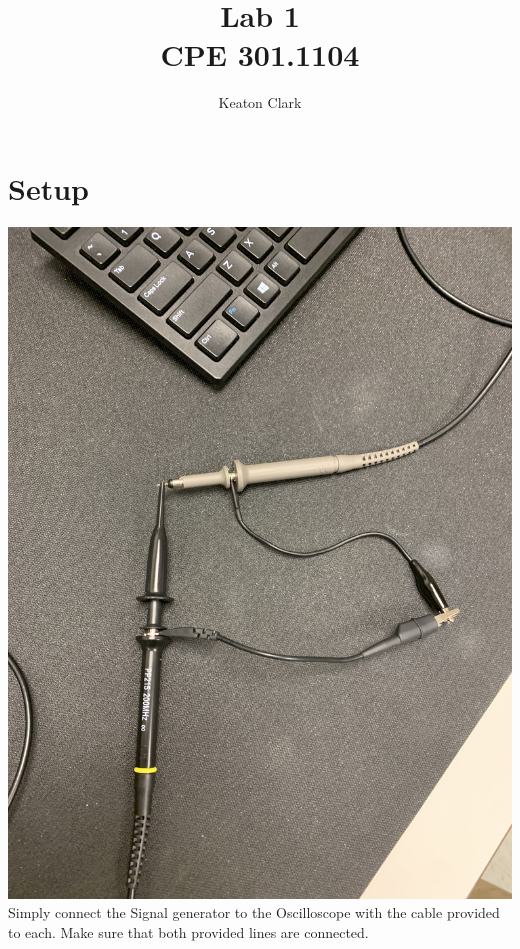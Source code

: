 \documentclass[]{article}
\title{Lab 1\\CPE 301.1104}
\author{Keaton Clark}
\begin{document}
\maketitle

\section{Setup}
\includegraphics[scale=.1]{connection.jpg}\\
Simply connect the Signal generator to the Oscilloscope with the cable provided to each. Make sure that both provided lines are connected.
\end{document}
